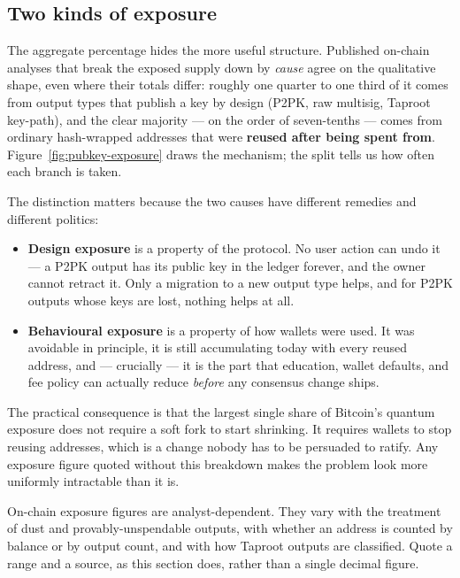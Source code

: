 \subsection{Two kinds of exposure}
\label{sec:two-exposures}

The aggregate percentage hides the more useful structure. Published on-chain
analyses that break the exposed supply down by \emph{cause} agree on the
qualitative shape, even where their totals differ: roughly one quarter to one
third of it comes from output types that publish a key by design (P2PK, raw
multisig, Taproot key-path), and the clear majority --- on the order of
seven-tenths --- comes from ordinary hash-wrapped addresses that were
\textbf{reused after being spent from}. Figure~\ref{fig:pubkey-exposure} draws
the mechanism; the split tells us how often each branch is taken.

The distinction matters because the two causes have different remedies and
different politics:

\begin{itemize}
  \item \textbf{Design exposure} is a property of the protocol. No user action
        can undo it --- a P2PK output has its public key in the ledger forever,
        and the owner cannot retract it. Only a migration to a new output type
        helps, and for P2PK outputs whose keys are lost, nothing helps at all.
  \item \textbf{Behavioural exposure} is a property of how wallets were used. It
        was avoidable in principle, it is still accumulating today with every
        reused address, and --- crucially --- it is the part that education,
        wallet defaults, and fee policy can actually reduce \emph{before} any
        consensus change ships.
\end{itemize}

The practical consequence is that the largest single share of Bitcoin's quantum
exposure does not require a soft fork to start shrinking. It requires wallets to
stop reusing addresses, which is a change nobody has to be persuaded to ratify.
Any exposure figure quoted without this breakdown makes the problem look more
uniformly intractable than it is.

\begin{remark}
On-chain exposure figures are analyst-dependent. They vary with the treatment of
dust and provably-unspendable outputs, with whether an address is counted by
balance or by output count, and with how Taproot outputs are classified. Quote a
range and a source, as this section does, rather than a single decimal figure.
\end{remark}

